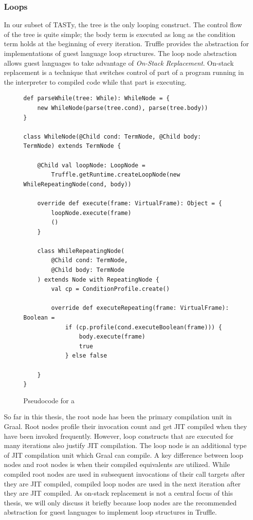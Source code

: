 \subsubsection*{Loops}

In our subset of TASTy, the  tree is the only looping construct.
The control flow of the  tree is quite simple; the body term is executed as long as the condition term holds at the beginning of every iteration.
Truffle provides the  abstraction for implementations of guest language loop structures.
The loop node abstraction allows guest languages to take advantage of \textit{On-Stack Replacement}\cite{osr}.
On-stack replacement is a technique that switches control of part of a program running in the interpreter to compiled code while that part is executing.

\begin{figure}[!htb]
\begin{verbatim}
def parseWhile(tree: While): WhileNode = {
	new WhileNode(parse(tree.cond), parse(tree.body))	
}
	
class WhileNode(@Child cond: TermNode, @Child body: TermNode) extends TermNode {
	
	@Child val loopNode: LoopNode = 
		Truffle.getRuntime.createLoopNode(new WhileRepeatingNode(cond, body))
	
	override def execute(frame: VirtualFrame): Object = {
		loopNode.execute(frame)
		()
	}
	
	class WhileRepeatingNode(
		@Child cond: TermNode, 
		@Child body: TermNode
	) extends Node with RepeatingNode {
		val cp = ConditionProfile.create()
		
		override def executeRepeating(frame: VirtualFrame): Boolean = 
			if (cp.profile(cond.executeBoolean(frame))) {
				body.execute(frame)
				true 
			} else false 
			
	}
}
\end{verbatim}
\caption{Pseudocode for a }
\label{impl:while}
\end{figure}

So far in this thesis, the root node has been the primary compilation unit in Graal.
Root nodes profile their invocation count and get JIT compiled when they have been invoked frequently.
However, loop constructs that are executed for many iterations also justify JIT compilation.
The loop node is an additional type of JIT compilation unit which Graal can compile.
A key difference between loop nodes and root nodes is when their compiled equivalents are utilized.
While compiled root nodes are used in subsequent invocations of their call targets after they are JIT compiled, compiled loop nodes are used in the next iteration after they are JIT compiled.
As on-stack replacement is not a central focus of this thesis, we will only discuss it briefly because loop nodes are the recommended abstraction for guest languages to implement loop structures in Truffle.

